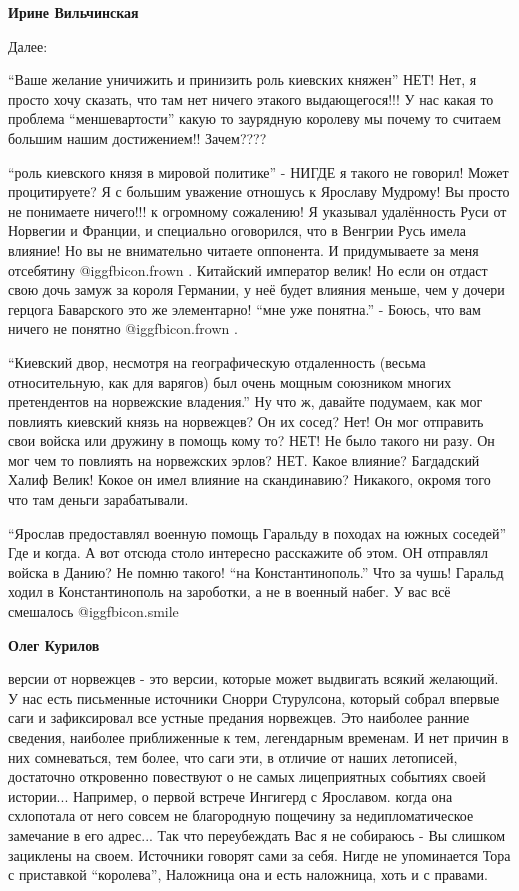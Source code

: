 \begin{itemize}
\begin{itemize}
\begin{itemize}
\textbf{Ирине Вильчинская} 

Далее: 

\enquote{Ваше желание уничижить и принизить роль киевских княжен} НЕТ! Нет, я просто
хочу сказать, что там нет ничего этакого выдающегося!!! У нас какая то проблема
\enquote{меншевартости} какую то заурядную королеву мы почему то считаем большим нашим
достижением!! Зачем???? 

\enquote{роль киевского князя в мировой политике} - НИГДЕ я
такого не говорил! Может процитируете? Я с большим уважение отношусь к Ярославу
Мудрому! Вы просто не понимаете ничего!!! к огромному сожалению! Я указывал
удалённость Руси от Норвегии и Франции, и специально оговорился, что в Венгрии
Русь имела влияние! Но вы не внимательно читаете оппонента. И придумываете за
меня отсебятину  @igg{fbicon.frown} . Китайский император велик! Но если он отдаст свою дочь
замуж за короля Германии, у неё будет влияния меньше, чем у дочери герцога
Баварского это же элементарно! \enquote{мне уже понятна.} - Боюсь, что вам ничего не
понятно  @igg{fbicon.frown} . 

\enquote{Киевский двор, несмотря на географическую отдаленность (весьма
относительную, как для варягов) был очень мощным союзником многих претендентов
на норвежские владения.} Ну что ж, давайте подумаем, как мог повлиять киевский
князь на норвежцев? Он их сосед? Нет! Он мог отправить свои войска или дружину
в помощь кому то? НЕТ! Не было такого ни разу. Он мог чем то повлиять на
норвежских эрлов? НЕТ. Какое влияние? Багдадский Халиф Велик! Кокое он имел
влияние на скандинавию? Никакого, окромя того что там деньги зарабатывали.

\enquote{Ярослав предоставлял военную помощь Гаральду в походах на южных соседей} Где и
когда. А вот отсюда столо интересно расскажите об этом. ОН отправлял войска в
Данию? Не помню такого! \enquote{на Константинополь.} Что за чушь! Гаральд ходил в
Константинополь на зароботки, а не в военный набег. У вас всё смешалось  @igg{fbicon.smile} 

\textbf{Олег Курилов} 

версии от норвежцев - это версии, которые может выдвигать всякий желающий. У
нас есть письменные источники Снорри Стурулсона, который собрал впервые саги и
зафиксировал все устные предания норвежцев. Это наиболее ранние сведения,
наиболее приближенные к тем, легендарным временам. И нет причин в них
сомневаться, тем более, что саги эти, в отличие от наших летописей, достаточно
откровенно повествуют о не самых лицеприятных событиях своей
истории... Например, о первой встрече Ингигерд с Ярославом. когда она схлопотала
от него совсем не благородную пощечину за недипломатическое замечание в его
адрес... Так что переубеждать Вас я не собираюсь - Вы слишком зациклены на
своем. Источники говорят сами за себя. Нигде не упоминается Тора с приставкой
\enquote{королева}, Наложница она и есть наложница, хоть и с правами.


\end{itemize}
\end{itemize}
\end{itemize}
